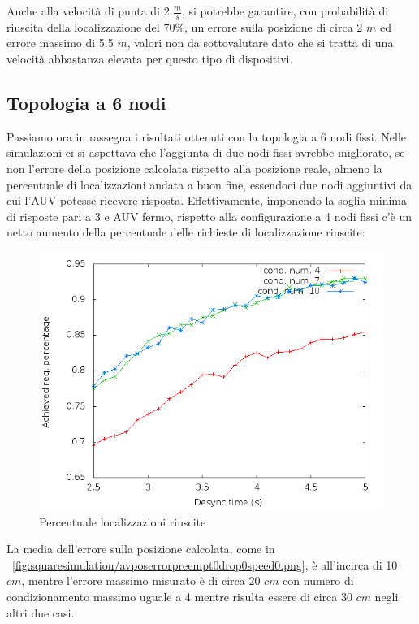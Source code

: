\documentclass[Lau,binding=0.6cm]{sapthesis}
\begin{document}
Anche alla velocità di punta di 2 $\frac{m}{s}$, si potrebbe garantire, con probabilità di riuscita della localizzazione del 70\%, un errore sulla posizione di circa 2 $m$ ed errore massimo di 5.5 $m$, valori non da sottovalutare dato che si tratta di una velocità abbastanza elevata per questo tipo di dispositivi. 

\subsection{Topologia a 6 nodi}
Passiamo ora in rassegna i risultati ottenuti con la topologia a 6 nodi fissi.
Nelle simulazioni ci si aspettava che l'aggiunta di due nodi fissi avrebbe migliorato, se non l'errore della posizione calcolata rispetto alla posizione reale, almeno la percentuale di localizzazioni andata a buon fine, essendoci due nodi aggiuntivi da cui l'AUV potesse ricevere risposta. Effettivamente, imponendo la soglia minima di risposte pari a 3 e AUV fermo, rispetto alla configurazione a 4 nodi fissi c'è un netto aumento della percentuale delle richieste di localizzazione riuscite:
\begin{figure}[H]
    \centering
    \includegraphics[scale=0.5]{hexagonsimulation/achievedlocreq3preempt0drop0speed0.png}
    \caption{Percentuale localizzazioni riuscite}
    \label{fig:hexagonsimulation/achievedlocreq3preempt0drop0speed0}
\end{figure}
La media dell'errore sulla posizione calcolata, come in ~\ref{fig:squaresimulation/avposerrorpreempt0drop0speed0.png}, è all'incirca di 10 $cm$, mentre l'errore massimo misurato è di circa 20 $cm$ con numero di condizionamento massimo uguale a 4 mentre risulta essere di circa 30 $cm$ negli altri due casi.
\end{document}
